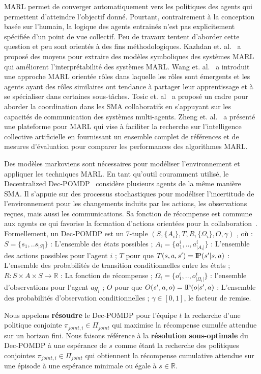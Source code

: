 \documentclass[contribution]{jfsma}
\newcommand{\probP}{\text{I\kern-0.15em P}}
\begin{document}
MARL permet de converger automatiquement vers les politiques des agents qui permettent d'atteindre l'objectif donné. Pourtant, contrairement à la conception basée sur l'humain, la logique des agents entrainés n'est pas explicitement spécifiée d'un point de vue collectif. Peu de travaux tentent d’aborder cette question et peu sont orientés à des fins méthodologiques.
Kazhdan et. al.~\cite{Kazhdan2020} a proposé des moyens pour extraire des modèles symboliques des systèmes MARL qui améliorent l'interprétabilité des systèmes MARL.
Wang et. al.~\cite{Wang2020} a introduit une approche MARL orientée rôles dans laquelle les rôles sont émergents et les agents ayant des rôles similaires ont tendance à partager leur apprentissage et à se spécialiser dans certaines sous-tâches.
Tosic et. al~\cite{Tosic2010} a proposé un cadre pour aborder la coordination dans les SMA collaboratifs en s'appuyant sur les capacités de communication des systèmes multi-agents.
Zheng et. al.~\cite{Zheng2018} a présenté une plateforme pour MARL qui vise à faciliter la recherche sur l'intelligence collective artificielle en fournissant un ensemble complet de références et de mesures d'évaluation pour comparer les performances des algorithmes MARL.

Des modèles markoviens sont nécessaires pour modéliser l'environnement et appliquer les techniques MARL. En tant qu'outil couramment utilisé, le Decentralized Dec-POMDP~\cite{Oliehoek2016} considère plusieurs agents de la même manière SMA. Il s'appuie sur des processus stochastiques pour modéliser l'incertitude de l'environnement pour les changements induits par les actions, les observations reçues, mais aussi les communications. Sa fonction de récompense est commune aux agents ce qui favorise la formation d'actions orientées pour la collaboration~\cite{Beynier2013}. Formellement, un Dec-POMDP est un 7-tuple $(S,\{A_i\},T,R,\{\Omega_i\},O,\gamma)$ , où : $S = \{s_1, .. s_{|S|}\}$ : L'ensemble des états possibles ; $A_{i} = \{a_{1}^{i},..,a_{|A_{i}|}^{i}\}$ : L'ensemble des actions possibles pour l'agent $i$ ; $T$ pour que $T(s,a,s') = \probP{(s'|s,a)}$ : L'ensemble des probabilités de transition conditionnelles entre les états ; $R : S \times A \times S \rightarrow \mathbb{R}$ : La fonction de récompense ; $\Omega_{i} = \{o_{1}^{i},..,o_{|\Omega_{i}|}^{i}\}$ : l'ensemble d'observations pour l'agent $ag_i$ ; $O$ pour que $O(s',a,o) = \probP{(o|s',a)}$ : L'ensemble des probabilités d'observation conditionnelles ; $\gamma \in [0,1]$, le facteur de remise.

Nous appelons \textbf{résoudre} le Dec-POMDP pour l'équipe $t$ la recherche d'une politique conjointe $\pi_{joint,i} \in \Pi_{joint}$ qui maximise la récompense cumulée attendue sur un horizon fini.
Nous faisons référence à la \textbf{résolution sous-optimale} du Dec-POMDP à une espérance de $s$ comme étant la recherche des politiques conjointes $\pi_{joint,i} \in \Pi_{joint}$ qui obtiennent la récompense cumulative attendue sur une épisode à une espérance minimale ou égale à $s \in \mathbb{R}$.
\end{document}
